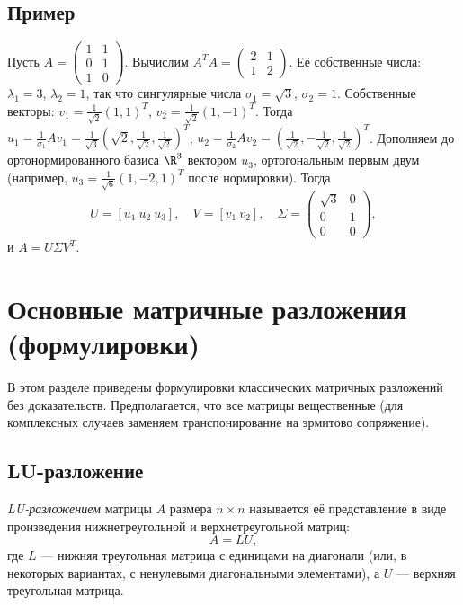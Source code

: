 \documentclass[10pt]{article}
\begin{document}
\subsection{Пример}

Пусть $A = \begin{pmatrix}1 & 1\\ 0 & 1\\ 1 & 0\end{pmatrix}$. Вычислим $A^TA = \begin{pmatrix}2 & 1\\ 1 & 2\end{pmatrix}$. Её собственные числа: $\lambda_1=3$, $\lambda_2=1$, так что сингулярные числа $\sigma_1=\sqrt{3}$, $\sigma_2=1$. Собственные векторы: $v_1=\frac{1}{\sqrt{2}}(1,1)^T$, $v_2=\frac{1}{\sqrt{2}}(1,-1)^T$. Тогда $u_1 = \frac{1}{\sigma_1}A v_1 = \frac{1}{\sqrt{3}}(\sqrt{2}, \frac{1}{\sqrt{2}}, \frac{1}{\sqrt{2}})^T$, $u_2 = \frac{1}{\sigma_2}A v_2 = (\frac{1}{\sqrt{2}}, -\frac{1}{\sqrt{2}}, \frac{1}{\sqrt{2}})^T$. Дополняем до ортонормированного базиса $\R^3$ вектором $u_3$, ортогональным первым двум (например, $u_3 = \frac{1}{\sqrt{6}}(1, -2, 1)^T$ после нормировки). Тогда
\[
U = [u_1\ u_2\ u_3],\quad V = [v_1\ v_2],\quad \Sigma = \begin{pmatrix}\sqrt{3} & 0\\ 0 & 1\\ 0 & 0\end{pmatrix},
\]
и $A = U\Sigma V^T$.

\section{Основные матричные разложения (формулировки)}

В этом разделе приведены формулировки классических матричных разложений без доказательств. Предполагается, что все матрицы вещественные (для комплексных случаев заменяем транспонирование на эрмитово сопряжение).

\subsection{LU-разложение}
\begin{definition}
    \textit{LU-разложением} матрицы $A$ размера $n\times n$ называется её представление в виде произведения нижнетреугольной и верхнетреугольной матриц:
    \[
    A = LU,
    \]
    где $L$ — нижняя треугольная матрица с единицами на диагонали (или, в некоторых вариантах, с ненулевыми диагональными элементами), а $U$ — верхняя треугольная матрица.
\end{definition}
\end{document}
